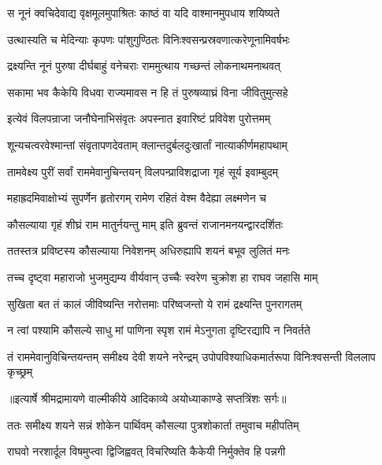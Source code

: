 \twolineshloka
{स नूनं क्वचिदेवाद्य वृक्षमूलमुपाश्रितः}
{काष्ठं वा यदि वाश्मानमुपधाय शयिष्यते} %

\twolineshloka
{उत्थास्यति च मेदिन्याः कृपणः पांशुगुण्ठितः}
{विनिःश्वसन्प्रस्रवणात्करेणूनामिवर्षभः} %

\twolineshloka
{द्रक्ष्यन्ति नूनं पुरुषा दीर्घबाहुं वनेचराः}
{राममुत्थाय गच्छन्तं लोकनाथमनाथवत्} %

\twolineshloka
{सकामा भव कैकेयि विधवा राज्यमावस}
{न हि तं पुरुषव्याघ्रं विना जीवितुमुत्सहे} %

\twolineshloka
{इत्येवं विलपन्राजा जनौघेनाभिसंवृतः}
{अपस्नात इवारिष्टं प्रविवेश पुरोत्तमम्} %

\twolineshloka
{शून्यचत्वरवेश्मान्तां संवृतापणदेवताम्}
{क्लान्तदुर्बलदुःखार्तां नात्याकीर्णमहापथाम्} %

\twolineshloka
{तामवेक्ष्य पुरीं सर्वां राममेवानुचिन्तयन्}
{विलपन्प्राविशद्राजा गृहं सूर्य इवाम्बुदम्} %

\twolineshloka
{महाह्रदमिवाक्षोभ्यं सुपर्णेन हृतोरगम्}
{रामेण रहितं वेश्म वैदेह्या लक्ष्मणेन च} %

\twolineshloka
{कौसल्याया गृहं शीघ्रं राम मातुर्नयन्तु माम्}
{इति ब्रुवन्तं राजानमनयन्द्वारदर्शितः} %

\twolineshloka
{ततस्तत्र प्रविष्टस्य कौसल्याया निवेशनम्}
{अधिरुह्यापि शयनं बभूव लुलितं मनः} %

\twolineshloka
{तच्च दृष्ट्वा महाराजो भुजमुद्यम्य वीर्यवान्}
{उच्चैः स्वरेण चुक्रोश हा राघव जहासि माम्} %

\twolineshloka
{सुखिता बत तं कालं जीविष्यन्ति नरोत्तमाः}
{परिष्वजन्तो ये रामं द्रक्ष्यन्ति पुनरागतम्} %

\twolineshloka
{न त्वां पश्यामि कौसल्ये साधु मां पाणिना स्पृश}
{रामं मेऽनुगता दृष्टिरद्यापि न निवर्तते} %

\fourlineindentedshloka
{तं राममेवानुविचिन्तयन्तम्}
{समीक्ष्य देवी शयने नरेन्द्रम्}
{उपोपविश्याधिकमार्तरूपा}
{विनिःश्वसन्ती विललाप कृच्छ्रम्} %


{॥इत्यार्षे श्रीमद्रामायणे वाल्मीकीये आदिकाव्ये अयोध्याकाण्डे सप्तत्रिंशः सर्गः॥}


\twolineshloka
{ततः समीक्ष्य शयने सन्नं शोकेन पार्थिवम्}
{कौसल्या पुत्रशोकार्ता तमुवाच महीपतिम्} %

\twolineshloka
{राघवो नरशार्दूल विषमुप्त्वा द्विजिह्ववत्}
{विचरिष्यति कैकेयी निर्मुक्तेव हि पन्नगी} %

